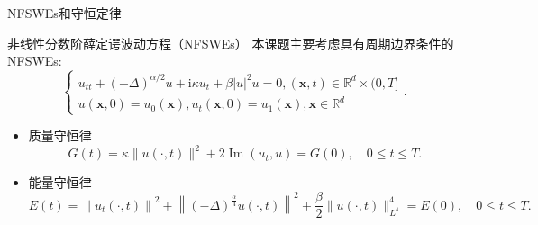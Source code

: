 \documentclass[aspectratio=169]{beamer}
\numberwithin{theorem}{section} %
\numberwithin{equation}{section}%
\numberwithin{figure}{section}%
\numberwithin{table}{section}%
\begin{document}

\begin{frame}{NFSWEs和守恒定律}
	\begin{block}{非线性分数阶薛定谔波动方程（NFSWEs）}
		本课题主要考虑具有周期边界条件的 NFSWEs:
		{\color{purple}\begin{equation}
			\left\{\begin{array}{l}
				u_{t t}+(-\Delta)^{\alpha / 2} u+\mathrm{i} \kappa u_t+\beta|u|^2 u=0,(\boldsymbol{x}, t) \in \mathbb{R}^d \times(0, T] \\
				u(\boldsymbol{x}, 0)=u_0(\boldsymbol{x}), u_t(\boldsymbol{x}, 0)=u_1(\boldsymbol{x}), \boldsymbol{x} \in \mathbb{R}^d
				\end{array}\right..
		\end{equation}}
		\vspace{-5mm}
		\begin{itemize}
		\item 质量守恒律
		\begin{equation}
			G(t)=\kappa\|u(\cdot, t)\|^2+2 \operatorname{Im}\left(u_t, u\right) = G(0), \quad 0 \leq t \leq T.
		\end{equation}
		\item 能量守恒律
		\begin{equation}\label{eq:10}
			E(t)=\left\|u_t(\cdot, t)\right\|^2+\left\|(-\Delta)^{\frac{\alpha}{4}} u(\cdot, t)\right\|^2+\frac{\beta}{2}\|u(\cdot, t)\|_{L^4}^4 = E(0), \quad 0 \leq t \leq T.
		\end{equation}
	\end{itemize}
	  \end{block}
\end{frame}
\end{document}

